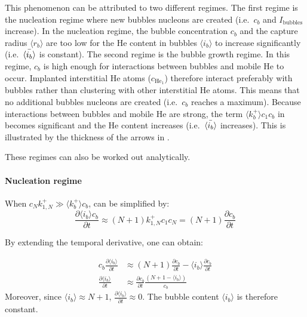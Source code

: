 This phenomenon can be attributed to two different regimes.
The first regime is the nucleation regime where new bubbles nucleons are created (i.e.\ $c_b$ and $I_\mathrm{bubbles}$ increase).
In the nucleation regime, the bubble concentration $c_b$ and the capture radius $\langle r_b \rangle$ are too low for the He content in bubbles $\langle i_b \rangle$ to increase significantly (i.e.\ $\Bar{\langle i_b \rangle}$ is constant).
The second regime is the bubble growth regime.
In this regime, $c_b$ is high enough for interactions between bubbles and mobile He to occur.
Implanted interstitial He atoms ($c_{\mathrm{He}_1}$) therefore interact preferably with bubbles rather than clustering with other interstitial He atoms.
This means that no additional bubbles nucleons are created (i.e.\ $c_b$ reaches a maximum).
Because interactions between bubbles and mobile He are strong, the term $\langle k_b^+ \rangle c_1 c_b$ in  becomes significant and the He content increases (i.e.\ $\Bar{\langle i_b \rangle}$ increases).
This is illustrated by the thickness of the arrows in .

These regimes can also be worked out analytically.
\paragraph{Nucleation regime}
When $c_N k_{1,N}^+ \gg \langle k_b^+ \rangle c_b$,  can be simplified by:
\begin{equation}
    \frac{\partial \langle i_b \rangle c_b}{\partial t} \approx (N +1) k_{1,N}^+ c_1 c_N = (N+1) \frac{\partial c_b }{\partial t}
\end{equation}

By extending the temporal derivative, one can obtain:

\begin{subequations}
    \begin{align}
        c_b \frac{\partial \langle i_b \rangle }{\partial t} &\approx (N +1) \frac{\partial c_b }{\partial t} - \langle i_b \rangle \frac{\partial c_b }{\partial t} \\
        \frac{\partial \langle i_b \rangle }{\partial t} &\approx \frac{\partial c_b }{\partial t} \frac{( N + 1 - \langle i_b \rangle)}{c_b}
    \end{align}
\end{subequations}
Moreover, since $\langle i_b \rangle \approx N + 1$, $\frac{\partial \langle i_b \rangle }{\partial t} \approx 0$.
The bubble content $\langle i_b \rangle$ is therefore constant.

